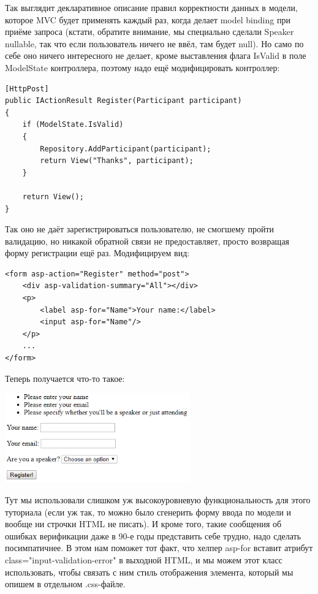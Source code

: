 \documentclass[a5paper]{article}
\begin{document}
Так выглядит декларативное описание правил корректности данных в модели, которое MVC будет применять каждый раз, когда делает model binding при приёме запроса (кстати, обратите внимание, мы специально сделали Speaker nullable, так что если пользователь ничего не ввёл, там будет null). 
Но само по себе оно ничего интересного не делает, кроме выставления флага IsValid в поле ModelState контроллера, поэтому надо ещё модифицировать контроллер:

\begin{verbatim}
[HttpPost]
public IActionResult Register(Participant participant)
{
    if (ModelState.IsValid)
    {
        Repository.AddParticipant(participant);
        return View("Thanks", participant);
    }

    return View();
}
\end{verbatim}

Так оно не даёт зарегистрироваться пользователю, не смогшему пройти валидацию, но никакой обратной связи не предоставляет, просто возвращая форму регистрации ещё раз. Модифицируем вид:

\begin{verbatim}
<form asp-action="Register" method="post">
    <div asp-validation-summary="All"></div>
    <p>
        <label asp-for="Name">Your name:</label>
        <input asp-for="Name"/>
    </p>
    ...
</form>
\end{verbatim}

Теперь получается что-то такое:

\begin{center}
	\includegraphics[width=0.6\textwidth]{validationError.png}
\end{center}

Тут мы использовали слишком уж высокоуровневую функциональность для этого туториала (если уж так, то можно было сгенерить форму ввода по модели и вообще ни строчки HTML не писать). И кроме того, такие сообщения об ошибках верификации даже в 90-е годы представить себе трудно, надо 
сделать посимпатичнее. В этом нам поможет тот факт, что хелпер asp-for вставит атрибут class="input-validation-error" в выходной HTML, и мы можем этот класс использовать, чтобы связать с ним стиль отображения элемента, который мы опишем в отдельном .css-файле.
\end{document}
